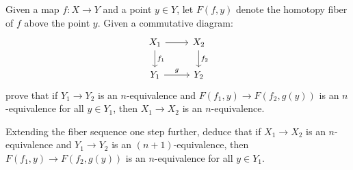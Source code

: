 \documentclass[11pt,letterpaper]{article}
\begin{document}
\begin{problem}
    Given a map $f : X \to Y$ and a point $y\in Y$, let $F(f, y)$ denote the homotopy fiber of $f$ above the point $y$. Given a commutative diagram:
    \[\begin{tikzcd}
        {X_1} & {X_2} \\
        {Y_1} & {Y_2}
        \arrow[from=1-1, to=1-2]
        \arrow["g", from=2-1, to=2-2]
        \arrow["{f_1}", from=1-1, to=2-1]
        \arrow["{f_2}", from=1-2, to=2-2]
    \end{tikzcd}\]
    prove that if $Y_1\to Y_2$ is an $n$-equivalence and $F(f_1,y) \to F(f_2,g(y))$ is an $n$-equivalence for all $y\in Y_1$, then $X_1\to X_2$ is an $n$-equivalence.

    \medskip
    \quad Extending the fiber sequence one step further, deduce that if $X_1\to X_2$ is an $n$-equivalence and $Y_1\to Y_2$ is an $(n+1)$-equivalence, then $F(f_1,y) \to F(f_2,g(y))$ is an $n$-equivalence for all $y\in Y_1$.
\end{problem}
\end{document}
